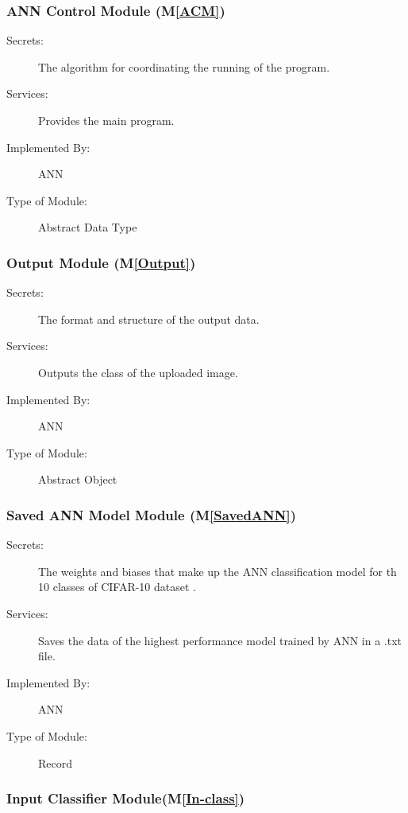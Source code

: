 \documentclass[12pt, titlepage]{article}
\newcommand{\mref}[1]{M\ref{#1}}
\begin{document}
\subsubsection{ANN Control Module (\mref{ACM})}

\begin{description}
\item[Secrets:]The algorithm for coordinating the running of the program.
\item[Services:]Provides the main program.
\item[Implemented By:] ANN
\item[Type of Module:] Abstract Data Type
\end{description}

\subsubsection{Output Module (\mref{Output})}

\begin{description}
\item[Secrets:]The format and structure of the output data.
\item[Services:]Outputs the class of the uploaded image.
\item[Implemented By:] ANN
\item[Type of Module:] Abstract Object
\end{description}

\subsubsection{Saved ANN Model Module (\mref{SavedANN})}

\begin{description}
  \item[Secrets:]The weights and biases that make up the ANN classification model for th 10
  classes of CIFAR-10 dataset \cite{CIFAR10}.
  \item[Services:]Saves the data of the highest performance model trained by ANN in 
  a .txt file.
  \item[Implemented By:] ANN
  \item[Type of Module:] Record
  \end{description}

  \subsubsection{Input Classifier Module(\mref{In-class})}
\end{document}
